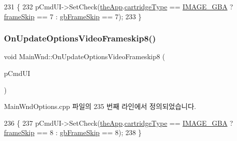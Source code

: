 \begin{DoxyCode}
231 \{
232   pCmdUI->SetCheck(\mbox{\hyperlink{_v_b_a_8cpp_a8095a9d06b37a7efe3723f3218ad8fb3}{theApp}}.\mbox{\hyperlink{class_v_b_a_af300759fcbc7eeb00ce73f956fc5ddb7}{cartridgeType}} == \mbox{\hyperlink{_util_8h_aef8b88d56fdf9a25f990a68d80c014d8a25f0ac1f3a37d568346fedece32e4bfb}{IMAGE\_GBA}} ? 
      \mbox{\hyperlink{_globals_8cpp_a668e22999d7fcea3ed14130fd680b795}{frameSkip}} == 7 : \mbox{\hyperlink{_g_b_8cpp_a2139360d32d74969f470ef05414ecaf8}{gbFrameSkip}} == 7);
233 \}
\end{DoxyCode}
\mbox{\label{class_main_wnd_ab25f2cb1c1aca7a47fccb953ee77d6ae}} 
\subsubsection{\texorpdfstring{On\+Update\+Options\+Video\+Frameskip8()}{OnUpdateOptionsVideoFrameskip8()}}
{\footnotesize\ttfamily void Main\+Wnd\+::\+On\+Update\+Options\+Video\+Frameskip8 (\begin{DoxyParamCaption}\item[{C\+Cmd\+UI $\ast$}]{p\+Cmd\+UI }\end{DoxyParamCaption})\hspace{0.3cm}{\ttfamily [protected]}}



Main\+Wnd\+Options.\+cpp 파일의 235 번째 라인에서 정의되었습니다.


\begin{DoxyCode}
236 \{
237   pCmdUI->SetCheck(\mbox{\hyperlink{_v_b_a_8cpp_a8095a9d06b37a7efe3723f3218ad8fb3}{theApp}}.\mbox{\hyperlink{class_v_b_a_af300759fcbc7eeb00ce73f956fc5ddb7}{cartridgeType}} == \mbox{\hyperlink{_util_8h_aef8b88d56fdf9a25f990a68d80c014d8a25f0ac1f3a37d568346fedece32e4bfb}{IMAGE\_GBA}} ? 
      \mbox{\hyperlink{_globals_8cpp_a668e22999d7fcea3ed14130fd680b795}{frameSkip}} == 8 : \mbox{\hyperlink{_g_b_8cpp_a2139360d32d74969f470ef05414ecaf8}{gbFrameSkip}} == 8);
238 \}
\end{DoxyCode}
\mbox{\label{class_main_wnd_af7fce43b8808d14ab4de5b3e23c3db49}} 
